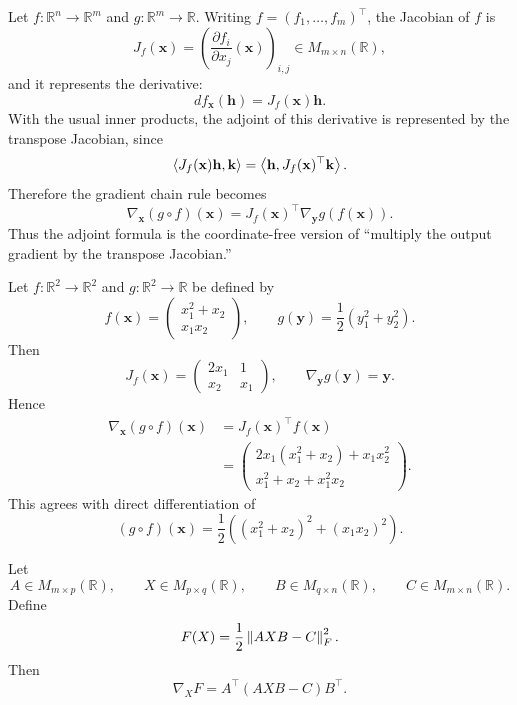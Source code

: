 \begin{remark}
Let $f:\mathbb{R}^n\to\mathbb{R}^m$ and
$g:\mathbb{R}^m\to\mathbb{R}$. Writing
$f=(f_1,\ldots,f_m)^{\top}$, the Jacobian of $f$ is
\[
    J_f(\mathbf{x})
    =
    \left(
        \frac{\partial f_i}{\partial x_j}(\mathbf{x})
    \right)_{i,j}
    \in M_{m\times n}(\mathbb{R}),
\]
and it represents the derivative:
\[
    df_{\mathbf{x}}(\mathbf{h})=J_f(\mathbf{x})\mathbf{h}.
\]
With the usual inner products, the adjoint of this derivative is represented
by the transpose Jacobian, since
\[
    \left\langle J_f(\mathbf{x})\mathbf{h}, \mathbf{k} \right\rangle
    =
    \left\langle \mathbf{h}, J_f(\mathbf{x})^{\top}\mathbf{k} \right\rangle.
\]
Therefore the gradient chain rule becomes
\[
    \nabla_{\mathbf{x}}(g\circ f)(\mathbf{x})
    =
    J_f(\mathbf{x})^{\top}
    \nabla_{\mathbf{y}}g(f(\mathbf{x})).
\]
Thus the adjoint formula is the coordinate-free version of ``multiply the
output gradient by the transpose Jacobian.''
\end{remark}

\begin{example}
Let $f:\mathbb{R}^2\to\mathbb{R}^2$ and
$g:\mathbb{R}^2\to\mathbb{R}$ be defined by
\[
    f(\mathbf{x})
    =
    \begin{pmatrix}
        x_1^2+x_2\\
        x_1x_2
    \end{pmatrix},
    \qquad
    g(\mathbf{y})=\frac{1}{2}(y_1^2+y_2^2).
\]
Then
\[
    J_f(\mathbf{x})
    =
    \begin{pmatrix}
        2x_1 & 1\\
        x_2 & x_1
    \end{pmatrix},
    \qquad
    \nabla_{\mathbf{y}}g(\mathbf{y})=\mathbf{y}.
\]
Hence
\[
\begin{aligned}
    \nabla_{\mathbf{x}}(g\circ f)(\mathbf{x})
    &=
    J_f(\mathbf{x})^{\top}f(\mathbf{x})\\
    &=
    \begin{pmatrix}
        2x_1(x_1^2+x_2)+x_1x_2^2\\
        x_1^2+x_2+x_1^2x_2
    \end{pmatrix}.
\end{aligned}
\]
This agrees with direct differentiation of
\[
    (g\circ f)(\mathbf{x})
    =
    \frac{1}{2}\left((x_1^2+x_2)^2+(x_1x_2)^2\right).
\]
\end{example}

\begin{proposition}
Let
\[
    A\in M_{m\times p}(\mathbb{R}),
    \qquad
    X\in M_{p\times q}(\mathbb{R}),
    \qquad
    B\in M_{q\times n}(\mathbb{R}),
    \qquad
    C\in M_{m\times n}(\mathbb{R}).
\]
Define
\[
    F(X)
    =
    \frac{1}{2}\left\lVert AXB-C \right\rVert_F^2.
\]
Then
\[
    \nabla_X F
    =
    A^\top(AXB-C)B^\top.
\]
\label{affine least square}
\end{proposition}

